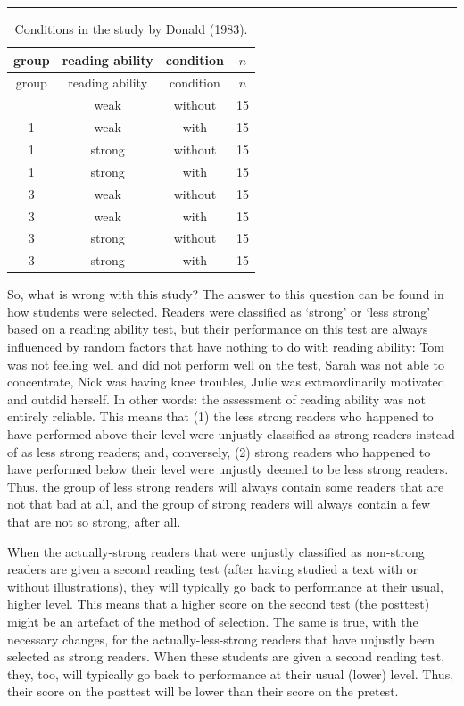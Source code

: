 \documentclass[
]{book}
\begin{document}
\begin{center}\rule{0.5\linewidth}{0.5pt}\end{center}

\begin{longtable}[]{@{}cccc@{}}
\caption{\label{tab:designDona83} Conditions in the study by Donald (1983).}\tabularnewline
\toprule\noalign{}
group & reading ability & condition & \(n\) \\
\midrule\noalign{}
\endfirsthead
\toprule\noalign{}
group & reading ability & condition & \(n\) \\
\midrule\noalign{}
\endhead
\bottomrule\noalign{}
\endlastfoot
1 & weak & without & 15 \\
1 & weak & with & 15 \\
1 & strong & without & 15 \\
1 & strong & with & 15 \\
3 & weak & without & 15 \\
3 & weak & with & 15 \\
3 & strong & without & 15 \\
3 & strong & with & 15 \\
\end{longtable}

So, what is wrong with this study? The answer to this question can be found in how students were selected. Readers were classified as `strong' or `less strong' based on a reading ability test, but their performance on this test are always influenced by random factors that have nothing to do with reading ability: Tom was not feeling well and did not perform well on the test, Sarah was not able to concentrate, Nick was having knee troubles, Julie was extraordinarily motivated and outdid herself. In other words: the assessment of reading ability was not entirely reliable. This means that (1) the less strong readers who happened to have performed above their level were unjustly classified as strong readers instead of as less strong readers; and, conversely, (2) strong readers who happened to have performed below their level were unjustly deemed to be less strong readers. Thus, the group of less strong readers will always contain some readers that are not that bad at all, and the group of strong readers will always contain a few that are not so strong, after all.

When the actually-strong readers that were unjustly classified as non-strong readers are given a second reading test (after having studied a text with or without illustrations), they will typically go back to performance at their usual, higher level. This means that a higher score on the second test (the posttest) might be an artefact of the method of selection. The same is true, with the necessary changes, for the actually-less-strong readers that have unjustly been selected as strong readers. When these students are given a second reading test, they, too, will typically go back to performance at their usual (lower) level. Thus, their score on the posttest will be lower than their score on the pretest.
\end{document}
